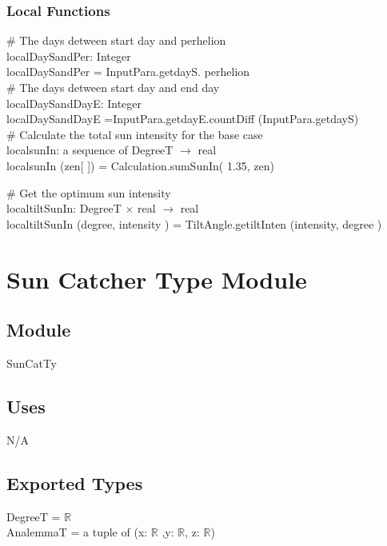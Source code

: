 \documentclass[12pt, titlepage]{article}
\begin{document}
\subsubsection{Local Functions}

$\#$ The days detween start day and perhelion\\
localDaySandPer: Integer\\
localDaySandPer = InputPara.getdayS. perhelion\\

$\#$ The days detween start day and end day\\
localDaySandDayE: Integer\\
localDaySandDayE =InputPara.getdayE.countDiff (InputPara.getdayS)\\

$\#$ Calculate the total sun intensity for the base case\\
localsunIn: a sequence of DegreeT $\rightarrow$ real\\
localsunIn (zen[ ]) = Calculation.sumSunIn( 1.35, zen)

$\#$ Get the optimum sun intensity\\
localtiltSunIn: DegreeT $\times$ real $\rightarrow$ real\\
localtiltSunIn (degree, intensity ) = TiltAngle.getiltInten (intensity, degree )


\section{Sun Catcher Type Module} \label{ModuleSCTM} 

\subsection{Module}
SunCatTy

\subsection{Uses}

N/A\\

\subsection{Exported Types}

DegreeT = $\mathbb{R}$\\
AnalemmaT = a tuple of (x: $\mathbb{R}$ ,y: $\mathbb{R}$, z: $\mathbb{R}$)\\
\end{document}
